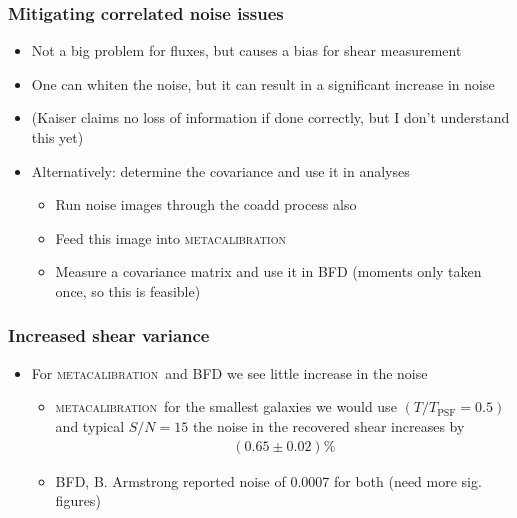 \documentclass{beamer}
\newcommand{\mcal}{\textsc{metacalibration}}
\begin{document}
\frame
{
    \frametitle{Mitigating correlated noise issues}

 
    \begin{itemize}

        \item Not a big problem for fluxes, but causes a bias for shear measurement

        \item One can whiten the noise, but it can result in a significant increase in noise

        \item (Kaiser claims no loss of information if done correctly, but I don't understand this yet)

        \item Alternatively: determine the covariance and use it in analyses
            \begin{itemize}
                \item Run noise images through the coadd process also
                \item Feed this image into \mcal
                \item Measure a covariance matrix and use it in BFD (moments only taken once, so this is feasible)
            \end{itemize}


    \end{itemize}

}

\frame
{
    \frametitle{Increased shear variance}

 
    \begin{itemize}

        \item For \mcal\ and BFD we see little increase in the noise
            \begin{itemize}

                \item \mcal\ for the smallest galaxies we would use $(T/T_{\textrm{PSF}} = 0.5)$ and typical $S/N = 15$
                    the noise in the recovered shear increases by 
                    \begin{align}
                    (0.65 \pm 0.02) \%
                    \end{align}

                \item BFD, B. Armstrong reported noise of 0.0007 for both (need more sig. figures)

            \end{itemize}

    \end{itemize}

}
\end{document}
